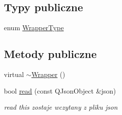 \subsection*{Typy publiczne}
\begin{DoxyCompactItemize}
\item 
enum \hyperlink{class_d_adding_methods_1_1_wrapper_acb6db05ae66304ccd8b53c49221e0b09}{Wrapper\-Type} 
\end{DoxyCompactItemize}
\subsection*{Metody publiczne}
\begin{DoxyCompactItemize}
\item 
virtual \hyperlink{class_d_adding_methods_1_1_wrapper_aa4f7725137a5389ee76db0bd8590243e}{$\sim$\-Wrapper} ()
\item 
bool \hyperlink{class_d_adding_methods_1_1_wrapper_ad8951e3aea612be776608e90eebca99b}{read} (const Q\-Json\-Object \&json)
\begin{DoxyCompactList}\small\item\em read this zostaje wczytany z pliku json \end{DoxyCompactList}\end{DoxyCompactItemize}
